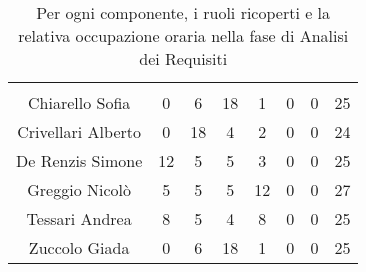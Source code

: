 \begin{table}[H]
	\begin{center}
		\begin{tabular}{c
				!{\color[HTML]{9b240a}\vrule width 1pt}
				cccccc
				!{\color[HTML]{9b240a}\vrule width 1pt}	
				c}
			\rowcolorhead
			 &  &  &  &  &  &  &  \\
			
			Chiarello Sofia & 0 & 6 & 18 & 1 & 0 & 0 & 25\\
			Crivellari Alberto & 0 & 18 & 4 & 2 & 0 & 0 & 24\\
			De Renzis Simone & 12 & 5 & 5 & 3 & 0 & 0 & 25\\
			Greggio Nicolò & 5 & 5 & 5 & 12 & 0 & 0 & 27\\
			Tessari Andrea & 8 & 5 & 4 & 8 & 0 & 0 & 25\\
			Zuccolo Giada & 0 & 6 & 18 & 1 & 0 & 0 & 25\\
		\end{tabular}
		\caption[Occupazione oraria Analisi dei Requisiti]{Per ogni componente, i ruoli ricoperti e la relativa occupazione oraria nella fase di Analisi dei Requisiti}
	\end{center}
\end{table}


